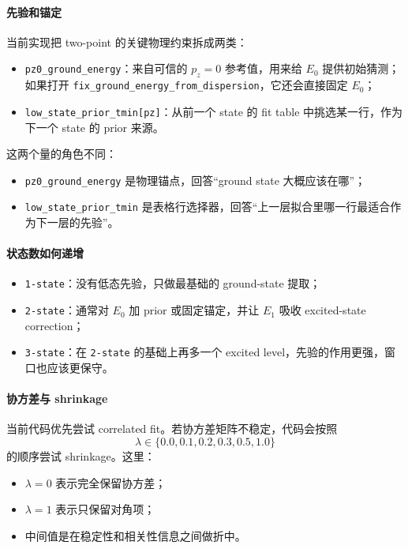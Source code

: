 \documentclass[11pt,a4paper,fontset=fandol]{ctexart}
\begin{document}
\paragraph{先验和锚定}
当前实现把 two-point 的关键物理约束拆成两类：

\begin{itemize}[leftmargin=2em]
  \item \lstinline|pz0_ground_energy|：来自可信的 $p_z=0$ 参考值，用来给 $E_0$ 提供初始猜测；如果打开 \lstinline|fix_ground_energy_from_dispersion|，它还会直接固定 $E_0$；
  \item \lstinline|low_state_prior_tmin[pz]|：从前一个 state 的 fit table 中挑选某一行，作为下一个 state 的 prior 来源。
\end{itemize}

这两个量的角色不同：

\begin{itemize}[leftmargin=2em]
  \item \lstinline|pz0_ground_energy| 是物理锚点，回答“ground state 大概应该在哪”；
  \item \lstinline|low_state_prior_tmin| 是表格行选择器，回答“上一层拟合里哪一行最适合作为下一层的先验”。
\end{itemize}

\paragraph{状态数如何递增}
\begin{itemize}[leftmargin=2em]
  \item \lstinline|1-state|：没有低态先验，只做最基础的 ground-state 提取；
  \item \lstinline|2-state|：通常对 $E_0$ 加 prior 或固定锚定，并让 $E_1$ 吸收 excited-state correction；
  \item \lstinline|3-state|：在 \lstinline|2-state| 的基础上再多一个 excited level，先验的作用更强，窗口也应该更保守。
\end{itemize}

\paragraph{协方差与 shrinkage}
当前代码优先尝试 correlated fit。若协方差矩阵不稳定，代码会按照
\begin{equation}
\lambda \in \{0.0, 0.1, 0.2, 0.3, 0.5, 1.0\}
\end{equation}
的顺序尝试 shrinkage。这里：

\begin{itemize}[leftmargin=2em]
  \item $\lambda=0$ 表示完全保留协方差；
  \item $\lambda=1$ 表示只保留对角项；
  \item 中间值是在稳定性和相关性信息之间做折中。
\end{itemize}
\end{document}
